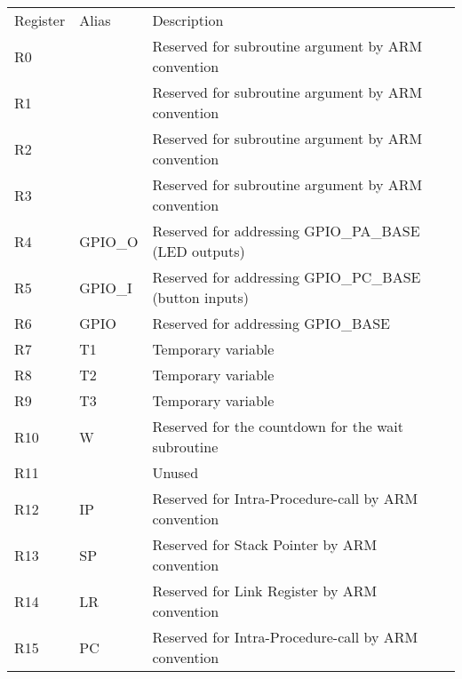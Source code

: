 \begin{table}
    \begin{tabular}{lll}
        Register & Alias  & Description                                          \\
        R0       & ~      & Reserved for subroutine argument by ARM convention   \\
        R1       & ~      & Reserved for subroutine argument by ARM convention   \\
        R2       & ~      & Reserved for subroutine argument by ARM convention   \\
        R3       & ~      & Reserved for subroutine argument by ARM convention   \\
        R4       & GPIO\_O & Reserved for addressing GPIO\_PA\_BASE (LED outputs) \\
        R5       & GPIO\_I & Reserved for addressing GPIO\_PC\_BASE (button inputs) \\
        R6       & GPIO   & Reserved for addressing GPIO\_BASE                   \\
        R7       & T1     & Temporary variable                                   \\
        R8       & T2     & Temporary variable                                   \\
        R9       & T3     & Temporary variable                                   \\
        R10      & W      & Reserved for the countdown for the wait subroutine   \\
        R11      & ~      & Unused                                               \\
        R12      & IP     & Reserved for Intra-Procedure-call by ARM convention  \\
        R13      & SP     & Reserved for Stack Pointer by ARM convention         \\
        R14      & LR     & Reserved for Link Register  by ARM convention        \\
        R15      & PC     & Reserved for Intra-Procedure-call by ARM convention  \\
    \end{tabular}
\end{table}
